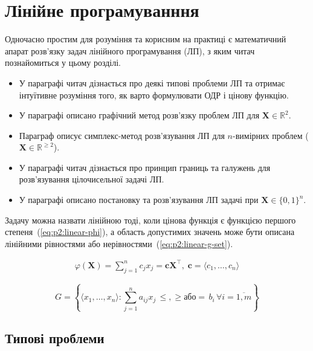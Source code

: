 \documentclass[\main/book.tex]{subfiles}
\begin{document}
\chapter{Лінійне програмуванння}

Одночасно простим для розуміння та корисним на практиці є математичний апарат розв'язку задач лінійного програмування (ЛП), з яким читач познайомиться у цьому розділі.

\begin{itemize}
 \item У параграфі  читач дізнається про деякі типові проблеми ЛП та отримає інтуїтивне розуміння того, як варто формулювати ОДР і цінову функцію.
 \item У параграфі  описано графічний метод розв'язку проблем ЛП для $\mathbf{X} \in \mathbb{R}^2$.
 \item Параграф  описує симплекс-метод розв'язування ЛП для $n$-вимірних проблем ($\mathbf{X} \in \mathbb{R}^{\geq 2}$).
 \item У параграфі  читач дізнається про принцип границь та галужень для розв'язування цілочисельної задачі ЛП.
 \item У параграфі  описано постановку та розв'язування ЛП задачі при $\mathbf{X} \in \{0,1\}^n$.
\end{itemize}

Задачу можна назвати лінійною тоді, коли цінова функція є функцією першого степеня~(\ref{eq:p2:linear-phi}), а область допустимих значень може бути описана лінійними рівностями або нерівностями~(\ref{eq:p2:linear-g-set}).

\begin{equation}
\begin{split}
 \varphi(\mathbf{X}) =
 \sum_{j=1}^n c_j x_j =
 \mathbf{c} \mathbf{X}^\top,\;
 \mathbf{c} = \langle c_1, \ldots, c_n \rangle
\end{split}
\label{eq:p2:linear-phi}
\end{equation}

\begin{equation}
 G = \left\{
  \langle x_1, \ldots, x_n \rangle:
  \sum_{j=1}^n a_{ij} x_j\,
   \boxed{\leq, \geq \text{або} =}\,
  b_i
  \,\forall i = \overline{1, m}
 \right\}
 \label{eq:p2:linear-g-set}
\end{equation}

\section{Типові проблеми}
\label{section:linear:typical}
\end{document}
